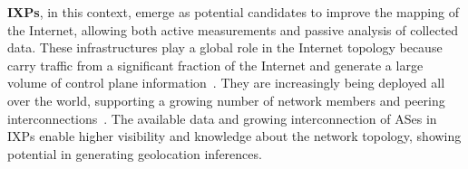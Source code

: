 
	\textbf{IXPs}, in this context, emerge as potential candidates to improve the mapping of the Internet, allowing both active measurements and passive analysis of collected data. These infrastructures play a global role in the Internet topology because carry traffic from a significant fraction of the Internet and generate a large volume of control plane information~\cite{Chatzis:2013:BUL:2504730.2504746}. They are increasingly being deployed all over the world, supporting a growing number of network members and peering interconnections~\cite{Giotsas:2017:DPI:3098822.3098855}. The available data and growing interconnection of ASes in IXPs enable higher visibility and knowledge about the network topology, showing potential in generating geolocation inferences.
	


